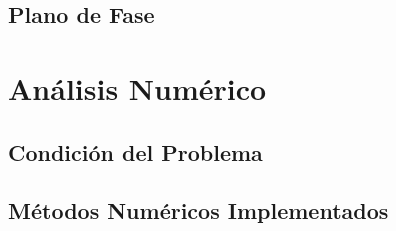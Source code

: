 \documentclass[a4paper,10pt,twocolumn]{article}
\begin{document}


\subsection{Plano de Fase}\label{subsec:plano-fase}



\section{Análisis Numérico}\label{sec:numerico}


\subsection{Condición del Problema}\label{subsec:condicion}



\subsection{Métodos Numéricos Implementados}\label{subsec:metodos}
\end{document}
